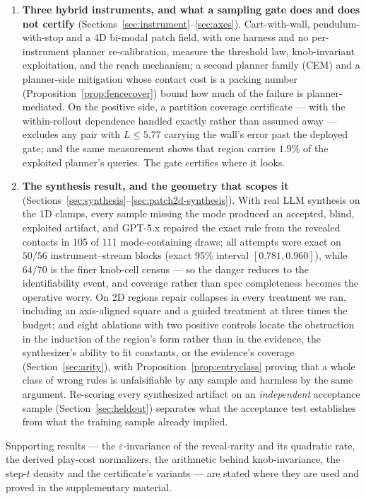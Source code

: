 \documentclass[11pt]{article}
\theoremstyle{definition}
\theoremstyle{remark}
\begin{document}
\begin{enumerate}
\item \textbf{Three hybrid instruments, and what a sampling gate does and does not certify} (Sections~\ref{sec:instrument}--\ref{sec:axes}). Cart-with-wall, pendulum-with-stop and a 4D bi-modal patch field, with one harness and no per-instrument planner re-calibration, measure the threshold law, knob-invariant exploitation, and the reach mechanism; a second planner family (CEM) and a planner-side mitigation whose contact cost is a packing number (Proposition~\ref{prop:fencecover}) bound how much of the failure is planner-mediated. On the positive side, a partition coverage certificate --- with the within-rollout dependence handled exactly rather than assumed away --- excludes any pair with $L \leq 5.77$ carrying the wall's error past the deployed gate; and the same measurement shows that region carries $1.9\%$ of the exploited planner's queries. The gate certifies where it looks.
\item \textbf{The synthesis result, and the geometry that scopes it} (Sections~\ref{sec:synthesis}--\ref{sec:patch2d-synthesis}). With real LLM synthesis on the 1D clamps, every sample missing the mode produced an accepted, blind, exploited artifact, and GPT-5.x repaired the exact rule from the revealed contacts in $105$ of $111$ mode-containing draws; all attempts were exact on $50/56$ instrument--stream blocks (exact 95\% interval $[0.781,0.960]$), while $64/70$ is the finer knob-cell census --- so the danger reduces to the identifiability event, and coverage rather than spec completeness becomes the operative worry. On 2D regions repair collapses in every treatment we ran, including an axis-aligned square and a guided treatment at three times the budget; and eight ablations with two positive controls locate the obstruction in the induction of the region's form rather than in the evidence, the synthesizer's ability to fit constants, or the evidence's coverage (Section~\ref{sec:arity}), with Proposition~\ref{prop:entryclass} proving that a whole class of wrong rules is unfalsifiable by any sample and harmless by the same argument. Re-scoring every synthesized artifact on an \emph{independent} acceptance sample (Section~\ref{sec:heldout}) separates what the acceptance test establishes from what the training sample already implied.
\end{enumerate}

Supporting results --- the $\varepsilon$-invariance of the reveal-rarity and its quadratic rate, the derived play-cost normalizers, the arithmetic behind knob-invariance, the step-$t$ density and the certificate's variants --- are stated where they are used and proved in the supplementary material.
\end{document}
